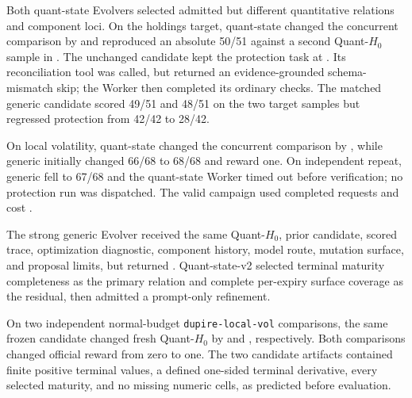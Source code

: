 
 Both quant-state
Evolvers selected admitted but different quantitative relations and component
loci. On the holdings target, quant-state changed the concurrent comparison by
\QStateHoldingsFirst{} and reproduced an absolute 50/51 against a second
Quant-$H_0$ sample in \QStateHoldingsRepeat{}. The unchanged candidate kept the
protection task at \QStateHoldingsProtection{}. Its reconciliation tool was
called, but returned an evidence-grounded schema-mismatch skip; the Worker then
completed its ordinary checks. The matched generic candidate scored 49/51 and
48/51 on the two target samples but regressed protection from 42/42 to 28/42.

On local volatility, quant-state changed the concurrent comparison by
\QStateLocalFirst{}, while generic initially changed 66/68 to 68/68 and reward
one. On independent repeat, generic fell to 67/68 and the quant-state Worker
timed out before verification; no protection run was dispatched. The valid
campaign used \QStateCanaryRequests{} completed requests and cost
\QStateCanaryCost{}. 

 The strong
generic Evolver received the same Quant-$H_0$, prior candidate, scored trace,
optimization diagnostic, component history, model route, mutation surface,
and proposal limits, but returned \QStateVTwoGeneric{}. Quant-state-v2 selected
terminal maturity completeness as the primary relation and complete per-expiry
surface coverage as the residual, then admitted a prompt-only refinement.

On two independent normal-budget \texttt{dupire-local-vol} comparisons, the
same frozen candidate changed fresh Quant-$H_0$ by
\QStateVTwoTargetFirst{} and \QStateVTwoTargetRepeat{}, respectively. Both
comparisons changed official reward from zero to one. The two candidate
artifacts contained finite positive terminal values, a defined one-sided
terminal derivative, every selected maturity, and no missing numeric cells,
as predicted before evaluation.

